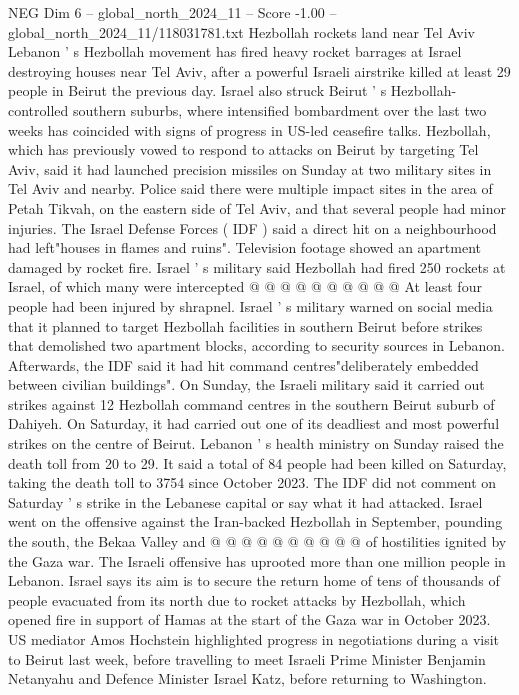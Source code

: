 \begin{textsample}{NEG Dim 6 – global\_north\_2024\_11 – Score -1.00 – global\_north\_2024\_11/118031781.txt}  \label{ex:f6_neg_158}
Hezbollah rockets land near Tel Aviv Lebanon ' s Hezbollah movement has fired heavy rocket barrages at Israel destroying houses near Tel Aviv, after a powerful Israeli airstrike killed at least 29 people in Beirut the previous day.
Israel also struck Beirut ' s Hezbollah-controlled southern suburbs, where intensified bombardment over the last two weeks has coincided with signs of progress in US-led ceasefire talks.
Hezbollah, which has previously vowed to respond to attacks on Beirut by targeting Tel Aviv, said it had launched precision missiles on Sunday at two military sites in Tel Aviv and nearby.
Police said there were multiple impact sites in the area of Petah Tikvah, on the eastern side of Tel Aviv, and that several people had minor injuries.
The Israel Defense Forces ( IDF ) said a direct hit on a neighbourhood had left"houses in flames and ruins".
Television footage showed an apartment damaged by rocket fire.
Israel ' s military said Hezbollah had fired 250 rockets at Israel, of which many were intercepted @ @ @ @ @ @ @ @ @ @ At least four people had been injured by shrapnel.
Israel ' s military warned on social media that it planned to target Hezbollah facilities in southern Beirut before strikes that demolished two apartment blocks, according to security sources in Lebanon.
Afterwards, the IDF said it had hit command centres"deliberately embedded between civilian buildings".
On Sunday, the Israeli military said it carried out strikes against 12 Hezbollah command centres in the southern Beirut suburb of Dahiyeh.
On Saturday, it had carried out one of its deadliest and most powerful strikes on the centre of Beirut.
Lebanon ' s health ministry on Sunday raised the death toll from 20 to 29.
It said a total of 84 people had been killed on Saturday, taking the death toll to 3754 since October 2023.
The IDF did not comment on Saturday ' s strike in the Lebanese capital or say what it had attacked.
Israel went on the offensive against the Iran-backed Hezbollah in September, pounding the south, the Bekaa Valley and @ @ @ @ @ @ @ @ @ @ of hostilities ignited by the Gaza war.
The Israeli offensive has uprooted more than one million people in Lebanon.
Israel says its aim is to secure the return home of tens of thousands of people evacuated from its north due to rocket attacks by Hezbollah, which opened fire in support of Hamas at the start of the Gaza war in October 2023.
US mediator Amos Hochstein highlighted progress in negotiations during a visit to Beirut last week, before travelling to meet Israeli Prime Minister Benjamin Netanyahu and Defence Minister Israel Katz, before returning to Washington.

\end{textsample}

